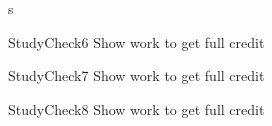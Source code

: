 \documentclass[a4paper,8pt]{book}
\begin{document}
\begin{exam}{s}
\begin{verA}
   \begin{problem*}{StudyCheck6}{ Show work to get full credit}\vspace{1cm}  
\begin{solution}[1.0in]\end{solution}
\end{problem*}
   \begin{problem*}{StudyCheck7}{ Show work to get full credit}\vspace{1cm}  
\begin{solution}[1.0in]\end{solution}
\end{problem*}
   \begin{problem*}{StudyCheck8}{ Show work to get full credit}\vspace{1cm}  
\begin{solution}[1.0in]\end{solution}
\end{problem*}



 




\end{verA}
\end{exam}
\end{document}
